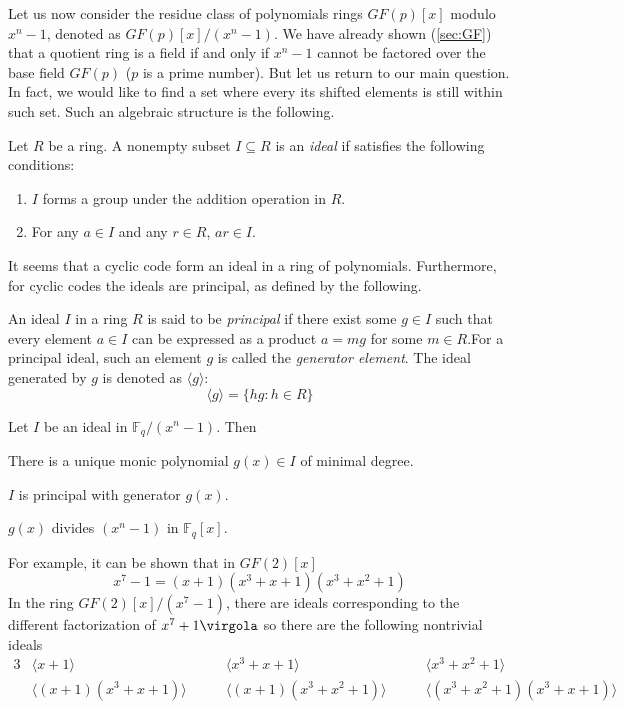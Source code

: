 Let us now consider the residue class of polynomials rings \( GF(p)[x] \) modulo \(x^n-1\), denoted as \(GF(p)[x]/(x^n-1)\). We have already shown (\ref{sec:GF}) that a quotient ring is a field if and only if \(x^n-1\) cannot be factored over the base field \(GF(p)\) ($p$ is a prime number).
But let us return to our main question. In fact, we would like to find a set where every its shifted elements is still within such set. Such an algebraic structure is the following.

\begin{Def}
Let $R$ be a ring. A nonempty subset $I\subseteq R$ is an \emph{ideal} if satisfies the following conditions:
\begin{enumerate}
\item $I$ forms a group under the addition operation in $R$.
\item For any \( a\in I\) and any \(r\in R\), \(ar\in I\).
\end{enumerate}
\end{Def}
It seems that a cyclic code form an ideal in a ring of polynomials. Furthermore, for cyclic codes the ideals are principal, as defined by the following.

\begin{Def}
An ideal $I$ in a ring $R$ is said to be \emph{principal} if there exist some \(g\in I\) such that every element \(a \in I \) can be expressed as a product \(a=mg\) for some \(m \in R\).For a principal ideal, such an element \(g\) is called the \emph{generator element}. The ideal generated by \(g\) is denoted as \(\langle g \rangle\):
\[
\langle g \rangle= \{hg: h \in R \}
\]
\end{Def}

\begin{Theorem} \label{th:ideals}
Let $I$ be an ideal in \( \mathbb F_q /(x^n-1) \). Then
\enumerate
\item There is a unique monic polynomial \(g(x) \in I\) of minimal degree.
\item $I$ is principal with generator $g(x)$.
\item \(g(x)\) divides \( (x^n -1) \) in \( \mathbb F_q[x] \).
\end{Theorem}
For example, it can be shown that in \(GF(2)[x]\)
\[
x^7-1=(x+1)(x^3+x+1)(x^3+x^2+1)
\]
In the ring \( GF(2)[x]/(x^7-1) \), there are ideals corresponding to the different factorization of \(x^7+1 \virgola\) so there are the following nontrivial ideals
\begin{alignat*}3
     & \langle x+1 \rangle & \qquad \langle x^3+x+1\rangle & \qquad \langle x^3+x^2+1\rangle \\
     & \langle (x+1)(x^3+x+1)\rangle & \qquad \langle (x+1)(x^3+x^2+1)\rangle & \qquad
     \langle (x^3+x^2+1)(x^3+x+1)\rangle
\end{alignat*}

